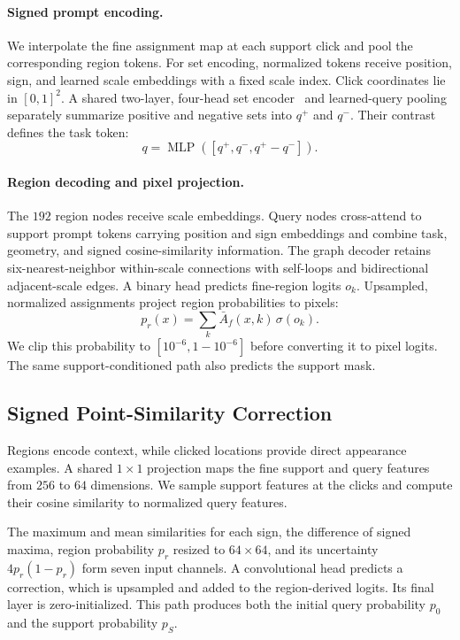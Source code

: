 \paragraph{Signed prompt encoding.}
We interpolate the fine assignment map at each support click and pool the corresponding region tokens. For set encoding, normalized tokens receive position, sign, and learned scale embeddings with a fixed scale index. Click coordinates lie in $[0,1]^2$. A shared two-layer, four-head set encoder~\cite{lee2019settransformer} and learned-query pooling separately summarize positive and negative sets into $q^+$ and $q^-$. Their contrast defines the task token:
\begin{equation}
 q=\operatorname{MLP}([q^+,q^-,q^+-q^-]).
\end{equation}

\paragraph{Region decoding and pixel projection.}
The $192$ region nodes receive scale embeddings. Query nodes cross-attend to support prompt tokens carrying position and sign embeddings and combine task, geometry, and signed cosine-similarity information. The graph decoder retains six-nearest-neighbor within-scale connections with self-loops and bidirectional adjacent-scale edges. A binary head predicts fine-region logits $o_k$. Upsampled, normalized assignments project region probabilities to pixels:
\begin{equation}
 p_r(x)=\sum_k\bar A_f(x,k)\,\sigma(o_k).
\label{eq:projection}
\end{equation}
We clip this probability to $[10^{-6},1-10^{-6}]$ before converting it to pixel logits. The same support-conditioned path also predicts the support mask.

\subsection{Signed Point-Similarity Correction}
\label{sec:point}
Regions encode context, while clicked locations provide direct appearance examples. A shared $1\times1$ projection maps the fine support and query features from $256$ to $64$ dimensions. We sample support features at the clicks and compute their cosine similarity to normalized query features.

The maximum and mean similarities for each sign, the difference of signed maxima, region probability $p_r$ resized to $64\times64$, and its uncertainty $4p_r(1-p_r)$ form seven input channels. A convolutional head predicts a correction, which is upsampled and added to the region-derived logits. Its final layer is zero-initialized. This path produces both the initial query probability $p_0$ and the support probability $p_S$.

